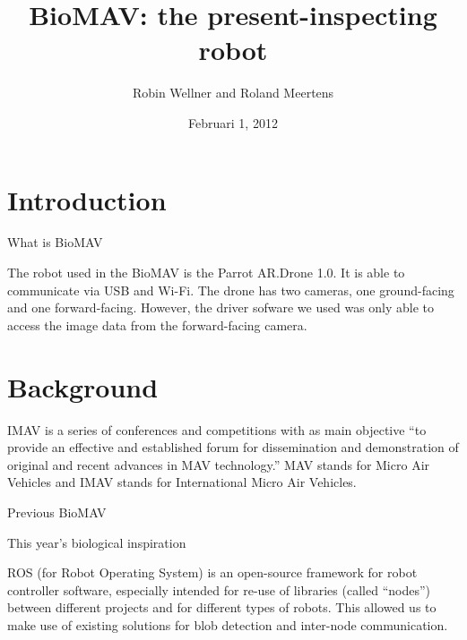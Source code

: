 \documentclass[a4paper,10pt]{article}
\begin{document}
\title{BioMAV: the present-inspecting robot}

\author{Robin Wellner and Roland Meertens}

\date{Februari 1, 2012}

\maketitle


\section{Introduction}
What is BioMAV

The robot used in the BioMAV is the Parrot AR.Drone 1.0. It is able to
communicate via USB and Wi-Fi. The drone has two cameras, one
ground-facing and one forward-facing. However, the driver sofware we
used was only able to access the image data from the forward-facing
camera.

\section{Background}
IMAV is a series of conferences and competitions with as main objective
``to provide an effective and established forum for dissemination and
demonstration of original and recent advances in MAV technology.''\cite{imav}
MAV stands for Micro Air Vehicles and IMAV stands for International
Micro Air Vehicles.

Previous BioMAV

This year's biological inspiration

ROS (for Robot Operating System) is an open-source framework for robot
controller software, especially intended for re-use of libraries
(called ``nodes'') between different projects and for different types of
robots. This allowed us to make use of existing solutions for blob
detection and inter-node communication.
\end{document}
